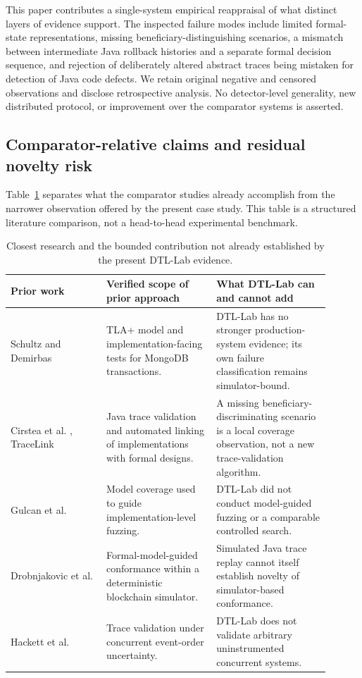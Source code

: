 This paper contributes a single-system empirical reappraisal of what distinct
layers of evidence support. The inspected failure modes include limited
formal-state representations, missing beneficiary-distinguishing scenarios,
a mismatch between intermediate Java rollback histories and a separate
formal decision sequence, and rejection of deliberately altered abstract
traces being mistaken for detection of Java code defects. We retain original
negative and censored observations and disclose retrospective analysis.
No detector-level generality, new distributed protocol, or improvement over
the comparator systems is asserted.

\subsection{Comparator-relative claims and residual novelty risk}
\label{subsec:close-comparators}

Table~\ref{tab:closest-comparators} separates what the comparator studies
already accomplish from the narrower observation offered by the present
case study. This table is a structured literature comparison, not a
head-to-head experimental benchmark.

\begin{table}[htbp]
\centering
\scriptsize
\caption{Closest research and the bounded contribution not already
established by the present DTL-Lab evidence.}
\label{tab:closest-comparators}
\begin{tabular}{@{}p{0.27\linewidth}p{0.31\linewidth}p{0.32\linewidth}@{}}
\hline
Prior work & Verified scope of prior approach & What DTL-Lab can and cannot add \\
\hline
Schultz and Demirbas \cite{schultz2025mongodb} & TLA+ model and
implementation-facing tests for MongoDB transactions. & DTL-Lab has no
stronger production-system evidence; its own failure classification
remains simulator-bound. \\
Cirstea et al. \cite{cirstea2025traces}, TraceLink
\cite{hackett2025tracelink} & Java trace validation and automated
linking of implementations with formal designs. & A missing
beneficiary-discriminating scenario is a local coverage observation,
not a new trace-validation algorithm. \\
Gulcan et al. \cite{gulcan2025modelfuzz} & Model coverage
used to guide implementation-level fuzzing. & DTL-Lab did not
conduct model-guided fuzzing or a comparable controlled search. \\
Drobnjakovic et al. \cite{drobnjakovic2025blockchains} &
Formal-model-guided conformance within a deterministic blockchain
simulator. & Simulated Java trace replay cannot itself establish
novelty of simulator-based conformance. \\
Hackett et al. \cite{hackett2026omnilink} &
Trace validation under concurrent event-order uncertainty. & DTL-Lab
does not validate arbitrary uninstrumented concurrent systems. \\
\hline
\end{tabular}
\end{table}

